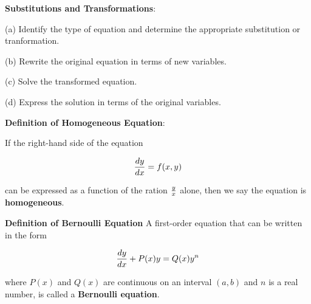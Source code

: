 \nopagenumbers
{\bf Substitutions and Transformations}: 

\vskip 6pt

\vskip 6pt
(a) Identify the type of equation and determine the appropriate substitution or tranformation.

\vskip 6pt
(b) Rewrite the original equation in terms of new variables.

\vskip 6pt
(c) Solve the transformed equation.

\vskip 6pt
(d) Express the solution in terms of the original variables.

\vskip 24pt

{\bf Definition of Homogeneous Equation}: 

\vskip 6pt
If the right-hand side of the equation

$${dy\over dx}=f(x,y)$$

can be expressed as a function of the ration ${y\over x}$ alone, then we say the equation is {\bf homogeneous}.

\vskip 24pt

{\bf Definition of Bernoulli Equation}
\vskip 6pt
A first-order equation that can be written in the form

$${dy\over dx}+P(x)y=Q(x)y^n$$

where $P(x)$ and $Q(x)$ are continuous on an interval $(a,b)$ and $n$ is a real number, is called a {\bf Bernoulli equation}.

\vfill\eject
\bye
